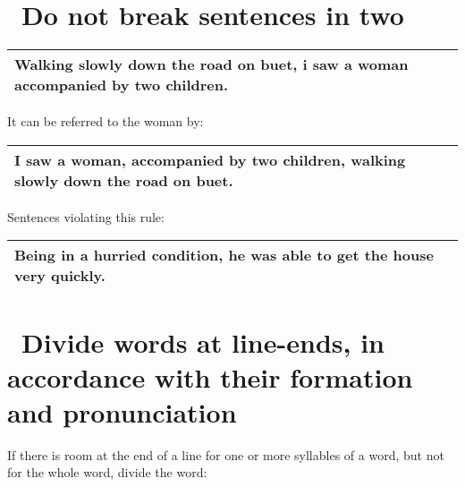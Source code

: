 \documentclass[10pt]{report}
\begin{document}
 \section {\bfseries \ Do not break sentences in two}


\begin{table}[!tbh]
    \centering
        \begin{tabular}{|l|}
        \hline
    Walking slowly down the road on buet, i saw a woman accompanied
by two children.\\
        \hline
       
        

 \end{tabular}
 \end{table}
 
 It can be referred to the woman by:


\begin{table}[!tbh]
    \centering
        \begin{tabular}{|l|}
        \hline
    I saw a woman, accompanied by two children, walking
slowly down the road on buet.\\
        \hline
       
        

 \end{tabular}
 \end{table}
 

 
 Sentences violating this rule:
 
 \begin{table}[!tbh]
    \centering
        \begin{tabular}{|l|}
        \hline
    Being in a hurried condition, he was able to get the
house very quickly.\\
        \hline
       
        

 \end{tabular}
 \end{table}
 
 
 
 \section {\bfseries \ Divide words at line-ends, in accordance with their formation and
pronunciation}

If there is room at the end of a line for one or more syllables of a word, but not for
the whole word, divide the word:\\
\end{document}
